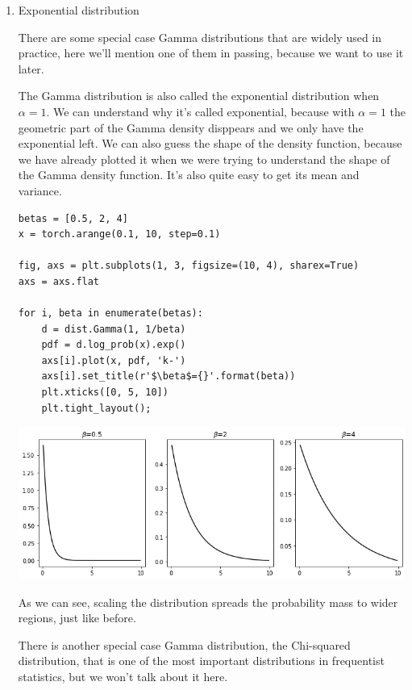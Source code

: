 \documentclass[11pt]{article}
\begin{document}
\begin{enumerate}
\item Exponential distribution
\label{sec:org5d59df0}

There are some special case Gamma distributions that are widely used in practice, here we'll mention one of them in passing, because we want to use it later.

The Gamma distribution is also called the exponential distribution when \(\alpha = 1\). We can understand why it's called exponential, because with \(\alpha=1\) the geometric part of the Gamma density disppears and we only have the exponential left. We can also guess the shape of the density function, because we have already plotted it when we were trying to understand the shape of the Gamma density function. It's also quite easy to get its mean and variance.

\begin{verbatim}
betas = [0.5, 2, 4]
x = torch.arange(0.1, 10, step=0.1)

fig, axs = plt.subplots(1, 3, figsize=(10, 4), sharex=True)
axs = axs.flat

for i, beta in enumerate(betas):
    d = dist.Gamma(1, 1/beta)
    pdf = d.log_prob(x).exp()
    axs[i].plot(x, pdf, 'k-')
    axs[i].set_title(r'$\beta$={}'.format(beta))
    plt.xticks([0, 5, 10])
    plt.tight_layout();
\end{verbatim}

\begin{center}
\includegraphics[width=.9\linewidth]{./.ob-jupyter/d3966c1d8501b2f112248d9cf12ad719b57d014a.png}
\end{center}

As we can see, scaling the distribution spreads the probability mass to wider regions, just like before.

There is another special case Gamma distribution, the Chi-squared distribution, that is one of the most important distributions in frequentist statistics, but we won't talk about it here.
\end{enumerate}
\end{document}
